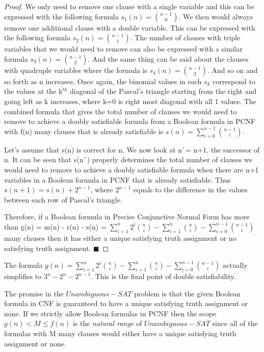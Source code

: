 \documentclass[runningheads,a4paper]{llncs}
\begin{document}
\begin{theorem}
\begin{proof}
We only need to remove one clause with a single variable and this can be expressed with the following formula $s_{1}(n) = \binom{n-1} {0}$. We then would always remove one additional clause with a double variable. This can be expressed with the following formula $s_{2}(n) = \binom{n-1} {1}$. The number of clauses with triple variables that we would need to remove can also be expressed with a similar formula $s_{3}(n) = \binom{n-1} {2}$. And the same thing can be said about the clauses with quadruple variables where the formula is $s_{4}(n) = \binom{n-1} {3}$. And so on and so forth as n increases. Once again, the binomial values in each $s_{k}$ correspond to the values at the k$^{th}$ diagonal of the Pascal's triangle starting from the right and going left as k increases, where k=0 is right most diagonal with all 1 values. The combined formula that gives the total number of clauses we would need to remove to achieve a doubly satisfiable formula from a Boolean formula in PCNF with f(n) many clauses that is already satisfiable is $s(n) = \sum_{i=0}^{n-1} \binom{n-1} {i}$.

Let's assume that s(n) is correct for n. We now look at n\`{}= n+1, the successor of n. It can be seen that s(n\`{}) properly determines the total number of clauses we would need to remove to achieve a doubly satisfiable formula when there are n+1 variables in a Boolean formula in PCNF that is already satisfiable. Thus $s(n+1) = s(n) + 2^{n-1} $, where $2^{n-1}$ equals to the difference in the values between each row of Pascal's triangle. 

Therefore, if a Boolean formula in Precise Conjunctive Normal Form has more than g(n) = m(n) - r(n) - s(n) = $\sum_{i=1}^{n} 2^{i} \binom{n} {i} - \sum_{i=1}^{n} \binom{n} {i} - \sum_{i=0}^{n-1} \binom{n-1} {i} $  many clauses then it has either a unique satisfying truth assignment or no satisfying truth assignment. $\blacksquare$

\end{proof}
\end{theorem}

The formula $ g(n) =  \sum_{i=1}^{n} 2^{i} \binom{n} {i} - \sum_{i=1}^{n} \binom{n} {i} -  \sum_{i=0}^{n-1} \binom{n-1} {i} $ actually simplifies to $3^{n}-2^{n}-2^{n-1}$. This is the final point of double satisfiability. 

\begin{definition}\normalfont

The promise in the ${Unambiguous-SAT}$ problem is that the given Boolean formula in CNF is guaranteed to have a unique satisfying truth assignment or none. If we strictly allow Boolean formulas in PCNF then the scope $g(n)<M \leq f(n)$ is the \emph{natural range} of ${Unambiguous-SAT}$ since all of the formulas with M many clauses would either have a unique satisfying truth assignment or none. 

\end{definition}
\end{document}
